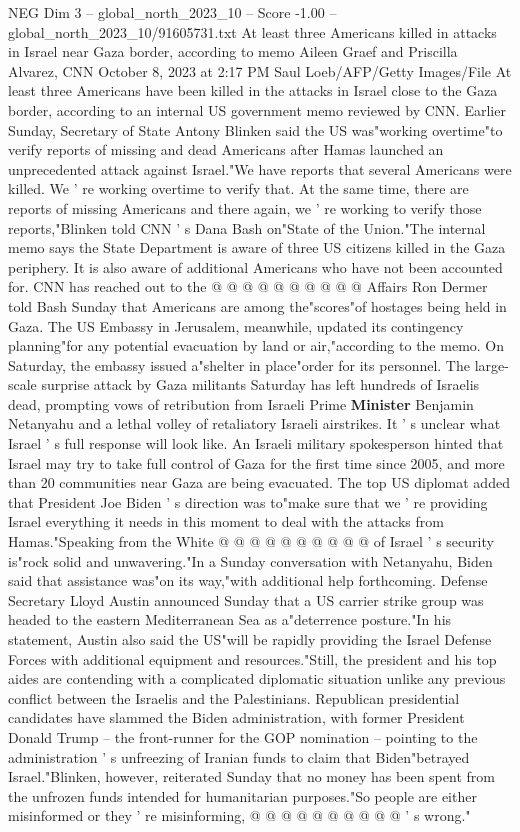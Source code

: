 \begin{textsample}{NEG Dim 3 – global\_north\_2023\_10 – Score -1.00 – global\_north\_2023\_10/91605731.txt}  \label{ex:f3_neg_253}
At least three Americans killed in attacks in Israel near Gaza border, according to memo Aileen Graef and Priscilla Alvarez, CNN October 8, 2023 at 2:17 PM Saul Loeb/AFP/Getty Images/File At least three Americans have been killed in the attacks in Israel close to the Gaza border, according to an internal US government memo reviewed by CNN.
Earlier Sunday, Secretary of State Antony Blinken said the US was"working overtime"to verify reports of missing and dead Americans after Hamas launched an unprecedented attack against Israel."We have reports that several Americans were killed.
We ' re working overtime to verify that.
At the same time, there are reports of missing Americans and there again, we ' re working to verify those reports,"Blinken told CNN ' s Dana Bash on"State of the Union."The internal memo says the State Department is aware of three US citizens killed in the Gaza periphery.
It is also aware of additional Americans who have not been accounted for.
CNN has reached out to the @ @ @ @ @ @ @ @ @ @ Affairs Ron Dermer told Bash Sunday that Americans are among the"scores"of hostages being held in Gaza.
The US Embassy in Jerusalem, meanwhile, updated its contingency planning"for any potential evacuation by land or air,"according to the memo.
On Saturday, the embassy issued a"shelter in place"order for its personnel.
The large-scale surprise attack by Gaza militants Saturday has left hundreds of Israelis dead, prompting vows of retribution from Israeli Prime \textbf{Minister} Benjamin Netanyahu and a lethal volley of retaliatory Israeli airstrikes.
It ' s unclear what Israel ' s full response will look like.
An Israeli military spokesperson hinted that Israel may try to take full control of Gaza for the first time since 2005, and more than 20 communities near Gaza are being evacuated.
The top US diplomat added that President Joe Biden ' s direction was to"make sure that we ' re providing Israel everything it needs in this moment to deal with the attacks from Hamas."Speaking from the White @ @ @ @ @ @ @ @ @ @ of Israel ' s security is"rock solid and unwavering."In a Sunday conversation with Netanyahu, Biden said that assistance was"on its way,"with additional help forthcoming.
Defense Secretary Lloyd Austin announced Sunday that a US carrier strike group was headed to the eastern Mediterranean Sea as a"deterrence posture."In his statement, Austin also said the US"will be rapidly providing the Israel Defense Forces with additional equipment and resources."Still, the president and his top aides are contending with a complicated diplomatic situation unlike any previous conflict between the Israelis and the Palestinians.
Republican presidential candidates have slammed the Biden administration, with former President Donald Trump -- the front-runner for the GOP nomination -- pointing to the administration ' s unfreezing of Iranian funds to claim that Biden"betrayed Israel."Blinken, however, reiterated Sunday that no money has been spent from the unfrozen funds intended for humanitarian purposes."So people are either misinformed or they ' re misinforming, @ @ @ @ @ @ @ @ @ @ ' s wrong."

\end{textsample}
